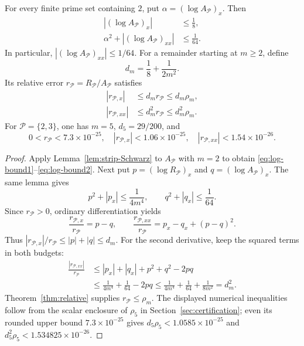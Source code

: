 \begin{theorem}\label{thm:jets}
For every finite prime set containing $2$, put
$\alpha=(\log A_{\mathcal P})_x$. Then
\begin{align}
 |(\log A_{\mathcal P})_x|&\le\frac18,\label{eq:log-bound1}\\
 \alpha^2+|(\log A_{\mathcal P})_{xx}|&\le\frac1{64}.
       \label{eq:log-bound2}
\end{align}
In particular, $|(\log A_{\mathcal P})_{xx}|\le1/64$.
For a remainder starting at $m\ge2$, define
\begin{equation}\label{eq:remainder-slope}
 d_m=\frac18+\frac1{2m^2}.
\end{equation}
Its relative error $r_{\mathcal P}=R_{\mathcal P}/A_{\mathcal P}$
satisfies
\begin{align}
 |r_{\mathcal P,x}|&\le d_mr_{\mathcal P}\le d_m\rho_m,
       \label{eq:r1}\\
 |r_{\mathcal P,xx}|&\le d_m^2r_{\mathcal P}\le d_m^2\rho_m.
       \label{eq:r2}
\end{align}
For $\mathcal P=\{2,3\}$, one has $m=5$, $d_5=29/200$, and
\begin{equation}\label{eq:three-numbers}
 0<r_{\mathcal P}<7.3\times10^{-25},\quad
 |r_{\mathcal P,x}|<1.06\times10^{-25},\quad
 |r_{\mathcal P,xx}|<1.54\times10^{-26}.
\end{equation}
\end{theorem}
\begin{proof}
Apply Lemma~\ref{lem:strip-Schwarz} to $A_{\mathcal P}$ with $m=2$
to obtain \eqref{eq:log-bound1}--\eqref{eq:log-bound2}. Next put
$p=(\log R_{\mathcal P})_x$ and $q=(\log A_{\mathcal P})_x$.
The same lemma gives
\[
 p^2+|p_x|\le\frac1{4m^4},\qquad
 q^2+|q_x|\le\frac1{64}.
\]
Since $r_{\mathcal P}>0$, ordinary differentiation yields
\[
 \frac{r_{\mathcal P,x}}{r_{\mathcal P}}=p-q,\qquad
 \frac{r_{\mathcal P,xx}}{r_{\mathcal P}}
 =p_x-q_x+(p-q)^2.
\]
Thus $|r_{\mathcal P,x}|/r_{\mathcal P}\le|p|+|q|\le d_m$.
For the second derivative, keep the squared terms in both budgets:
\begin{align*}
 \frac{|r_{\mathcal P,xx}|}{r_{\mathcal P}}
 &\le |p_x|+|q_x|+p^2+q^2-2pq\\
 &\le\frac1{4m^4}+\frac1{64}-2pq
 \le\frac1{4m^4}+\frac1{64}+\frac1{8m^2}=d_m^2.
\end{align*}
Theorem~\ref{thm:relative} supplies $r_{\mathcal P}\le\rho_m$.
The displayed numerical inequalities follow from the scalar enclosure of
$\rho_5$ in Section~\ref{sec:certification}; even its rounded upper bound
$7.3\times10^{-25}$ gives
$d_5\rho_5<1.0585\times10^{-25}$ and
$d_5^2\rho_5<1.534825\times10^{-26}$.
\end{proof}

